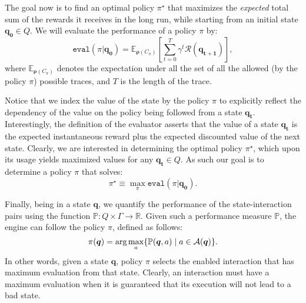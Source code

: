 The goal now is to find an optimal policy $\pi^{\star}$ that maximizes the \emph{expected} total sum of the rewards it receives in the long run, while starting from an initial state $ \bm{q_{0}} \in Q$. We will evaluate the performance of a policy $\pi$ by:
\begin{equation}
\label{Eq:ValueOne}
\texttt{eval}({\pi}| \bm{q_{0}})  = \mathbb{E}_{\bm{\rho}(C_\pi)} \left[\sum_{t=0}^{T} \gamma^{t}\mathcal{R}( \bm{q_{t+1}})\right],
\end{equation}
where  $\mathbb{E}_{\bm{\rho}(C_\pi)}$ denotes the expectation under all the set of all the allowed (by the policy $\pi$) possible traces, and $T$ is the length of the trace. 


Notice that we index the value of the state by the policy $\pi$ to explicitly reflect the dependency of the value on the policy being followed from a state $ \bm{q_{t}}$. Interestingly, the definition of the evaluator asserts that the value of a state $ \bm{q_{t}}$ is the expected instantaneous reward plus the expected discounted value of the next state. Clearly, we are interested in determining the optimal policy $\pi^{\star}$, which upon its usage yields maximized values for any $ \bm{q_{t}} \in Q$. As such our goal is to determine a policy $\pi$ that solves:
\begin{equation*}
\pi^{\star} \equiv \max_{\pi} \texttt{eval}({\pi}| \bm{q_{0}}). 
\end{equation*}



Finally, being in a state $ \bm{q}$, we quantify the performance of the state-interaction pairs using the function $\mathbb{P}: Q \times \Gamma \rightarrow \mathbb{R}$. Given such a performance measure $\mathbb{P}$, the engine can follow the policy $\pi$, defined as follows: 
\begin{equation}
\label{Eq:Policy}
\pi( \bm{q}) = \arg\max_{a} \{\mathbb{P}( \bm{q},a) \mid a \in {\cal A}( \bm{q})\}.
\end{equation}
In other words, given a state $ \bm{q}$, policy $\pi$ selects the enabled interaction that has maximum evaluation from that state. Clearly, an interaction must have a maximum evaluation when it is guaranteed that its execution will not lead to a bad state. 

